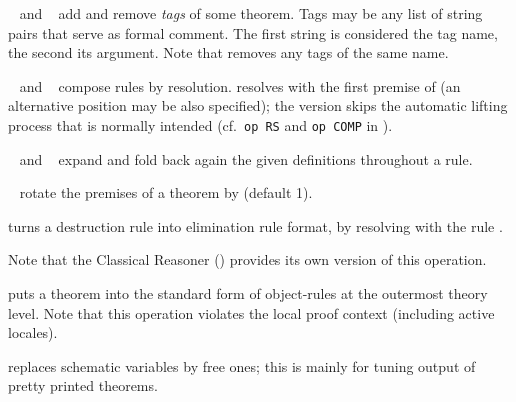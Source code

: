 \begin{isabellebody}
\begin{isamarkuptext}
  \begin{descr}

  \item [\mbox{\isa{tagged}}~\isa{name\ arg} and \mbox{\isa{untagged}}~\isa{name}] add and remove \emph{tags} of some theorem.
  Tags may be any list of string pairs that serve as formal comment.
  The first string is considered the tag name, the second its
  argument.  Note that \mbox{} removes any tags of the
  same name.

  \item [\mbox{\isa{THEN}}~\isa{a} and \mbox{\isa{COMP}}~\isa{a}]
  compose rules by resolution.  \mbox{} resolves with the
  first premise of  (an alternative position may be also
  specified); the \mbox{} version skips the automatic
  lifting process that is normally intended (cf.\ \verb|op RS| and
  \verb|op COMP| in \cite[\S5]{isabelle-ref}).
  
  \item [\mbox{\isa{unfolded}}~\isa{a\isactrlsub {\isadigit{1}}\ {\isasymdots}\ a\isactrlsub n} and
  \mbox{\isa{folded}}~\isa{a\isactrlsub {\isadigit{1}}\ {\isasymdots}\ a\isactrlsub n}] expand and fold
  back again the given definitions throughout a rule.

  \item [\mbox{\isa{rotated}}~\isa{n}] rotate the premises of a
  theorem by  (default 1).

  \item [\mbox{\isa{Pure{\isachardot}elim{\isacharunderscore}format}}] turns a destruction rule into
  elimination rule format, by resolving with the rule .
  
  Note that the Classical Reasoner () provides
  its own version of this operation.

  \item [\mbox{\isa{standard}}] puts a theorem into the standard form
  of object-rules at the outermost theory level.  Note that this
  operation violates the local proof context (including active
  locales).

  \item [\mbox{\isa{no{\isacharunderscore}vars}}] replaces schematic variables by free
  ones; this is mainly for tuning output of pretty printed theorems.


\end{descr}
\end{isamarkuptext}
\end{isabellebody}
